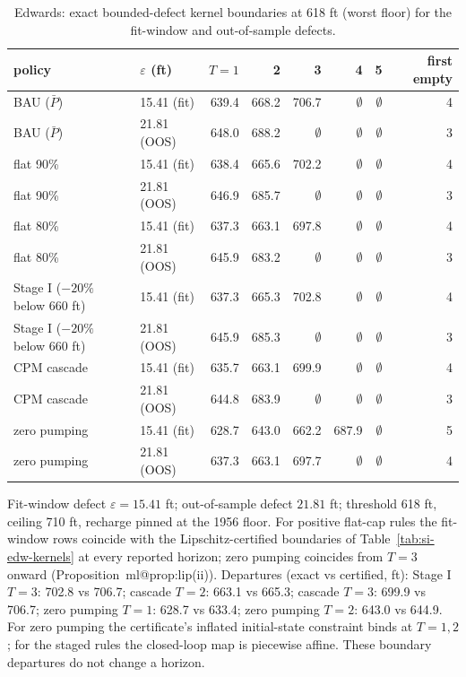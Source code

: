 \documentclass[11pt,a4paper]{article}
\makeatletter
\newcommand{\mref}[1]{\csname ml@#1\endcsname}
\makeatother
\begin{document}
\begin{table}[H]
\centering
\caption{Edwards: exact bounded-defect kernel boundaries at 618 ft (worst floor) for the fit-window and out-of-sample defects.}
\label{tab:si-edw-be}
\small
\begin{tabular}{llrrrrrr}
\toprule
policy & $\varepsilon$ (ft) & $T{=}1$ & 2 & 3 & 4 & 5 & first empty \\
\midrule
BAU ($\bar P$) & 15.41 (fit) & 639.4 & 668.2 & 706.7 & $\emptyset$ & $\emptyset$ & 4 \\
BAU ($\bar P$) & 21.81 (OOS) & 648.0 & 688.2 & $\emptyset$ & $\emptyset$ & $\emptyset$ & 3 \\
flat 90\% & 15.41 (fit) & 638.4 & 665.6 & 702.2 & $\emptyset$ & $\emptyset$ & 4 \\
flat 90\% & 21.81 (OOS) & 646.9 & 685.7 & $\emptyset$ & $\emptyset$ & $\emptyset$ & 3 \\
flat 80\% & 15.41 (fit) & 637.3 & 663.1 & 697.8 & $\emptyset$ & $\emptyset$ & 4 \\
flat 80\% & 21.81 (OOS) & 645.9 & 683.2 & $\emptyset$ & $\emptyset$ & $\emptyset$ & 3 \\
Stage I ($-20\%$ below 660 ft) & 15.41 (fit) & 637.3 & 665.3 & 702.8 & $\emptyset$ & $\emptyset$ & 4 \\
Stage I ($-20\%$ below 660 ft) & 21.81 (OOS) & 645.9 & 685.3 & $\emptyset$ & $\emptyset$ & $\emptyset$ & 3 \\
CPM cascade & 15.41 (fit) & 635.7 & 663.1 & 699.9 & $\emptyset$ & $\emptyset$ & 4 \\
CPM cascade & 21.81 (OOS) & 644.8 & 683.9 & $\emptyset$ & $\emptyset$ & $\emptyset$ & 3 \\
zero pumping & 15.41 (fit) & 628.7 & 643.0 & 662.2 & 687.9 & $\emptyset$ & 5 \\
zero pumping & 21.81 (OOS) & 637.3 & 663.1 & 697.7 & $\emptyset$ & $\emptyset$ & 4 \\
\bottomrule
\end{tabular}
\par\smallskip\begin{minipage}{0.97\linewidth}\footnotesize Fit-window defect $\varepsilon=15.41$ ft; out-of-sample defect $21.81$ ft; threshold 618 ft, ceiling 710 ft, recharge pinned at the 1956 floor. For positive flat-cap rules the fit-window rows coincide with the Lipschitz-certified boundaries of Table~\ref{tab:si-edw-kernels} at every reported horizon; zero pumping coincides from $T=3$ onward (Proposition~\mref{prop:lip}(ii)). Departures (exact vs certified, ft): Stage I $T=3$: 702.8 vs 706.7; cascade $T=2$: 663.1 vs 665.3; cascade $T=3$: 699.9 vs 706.7; zero pumping $T=1$: 628.7 vs 633.4; zero pumping $T=2$: 643.0 vs 644.9. For zero pumping the certificate's inflated initial-state constraint binds at $T=1,2$; for the staged rules the closed-loop map is piecewise affine. These boundary departures do not change a horizon.\end{minipage}
\end{table}
\end{document}

